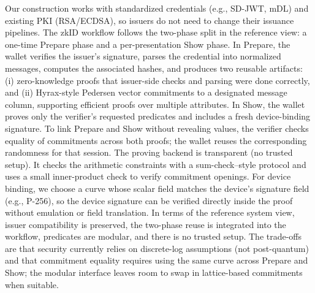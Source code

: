 Our construction works with standardized credentials (e.g., SD-JWT, mDL) and existing PKI (RSA/ECDSA), so issuers do not need to change their issuance pipelines.
The zkID workflow follows the two-phase split in the reference view: a one-time Prepare phase and a per-presentation Show phase.
In Prepare, the wallet verifies the issuer’s signature, parses the credential into normalized messages, computes the associated hashes, and produces two reusable artifacts: (i) zero-knowledge proofs that issuer-side checks and parsing were done correctly, and (ii) Hyrax-style Pedersen vector commitments to a designated message column, supporting efficient proofs over multiple attributes.
In Show, the wallet proves only the verifier’s requested predicates and includes a fresh device-binding signature. To link Prepare and Show without revealing values, the verifier checks equality of commitments across both proofs; the wallet reuses the corresponding randomness for that session.
The proving backend is transparent (no trusted setup). It checks the arithmetic constraints with a sum-check–style protocol and uses a small inner-product check to verify commitment openings. For device binding, we choose a curve whose scalar field matches the device’s signature field (e.g., P-256), so the device signature can be verified directly inside the proof without emulation or field translation. 
In terms of the reference system view, issuer compatibility is preserved, the two-phase reuse is integrated into the workflow, predicates are modular, and there is no trusted setup. The trade-offs are that security currently relies on discrete-log assumptions (not post-quantum) and that commitment equality requires using the same curve across Prepare and Show; the modular interface leaves room to swap in lattice-based commitments when suitable.